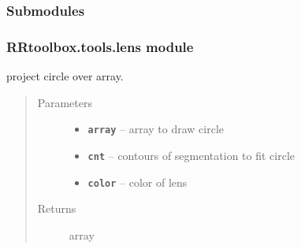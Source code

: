 \documentclass[letterpaper,10pt,english]{sphinxmanual}
\begin{document}
\subsubsection{Submodules}
\label{RRtoolbox.tools:submodules}

\subsubsection{RRtoolbox.tools.lens module}
\label{RRtoolbox.tools:rrtoolbox-tools-lens-module}\label{RRtoolbox.tools:module-RRtoolbox.tools.lens}

\begin{fulllineitems}
\label{RRtoolbox.tools:RRtoolbox.tools.lens.drawCircle}
project circle over array.
\begin{quote}\begin{description}
\item[{Parameters}] \leavevmode\begin{itemize}
\item {} 
\textbf{\texttt{array}} -- array to draw circle

\item {} 
\textbf{\texttt{cnt}} -- contours of segmentation to fit circle

\item {} 
\textbf{\texttt{color}} -- color of lens

\end{itemize}

\item[{Returns}] \leavevmode
array

\end{description}\end{quote}

\end{fulllineitems}

\end{document}
